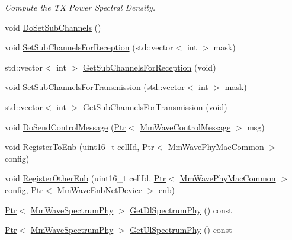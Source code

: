 \begin{DoxyCompactItemize}
\begin{DoxyCompactList}\small\item\em Compute the TX Power Spectral Density. \end{DoxyCompactList}\item 
void \hyperlink{classns3_1_1MmWaveUePhy_a8e0e2f31e720ccd1b156f119b3918bc2}{Do\+Set\+Sub\+Channels} ()
\item 
void \hyperlink{classns3_1_1MmWaveUePhy_a79c935f5714cf1e9338248d7e3237733}{Set\+Sub\+Channels\+For\+Reception} (std\+::vector$<$ int $>$ mask)
\item 
std\+::vector$<$ int $>$ \hyperlink{classns3_1_1MmWaveUePhy_ac4ded53bed0b3af38c56692175f13311}{Get\+Sub\+Channels\+For\+Reception} (void)
\item 
void \hyperlink{classns3_1_1MmWaveUePhy_af282ce87d27141f5c0322caf44044a9f}{Set\+Sub\+Channels\+For\+Transmission} (std\+::vector$<$ int $>$ mask)
\item 
std\+::vector$<$ int $>$ \hyperlink{classns3_1_1MmWaveUePhy_ad04070928a373ffa23fae98685a863d9}{Get\+Sub\+Channels\+For\+Transmission} (void)
\item 
void \hyperlink{classns3_1_1MmWaveUePhy_a467bd23a6941464f7c768a5957af0552}{Do\+Send\+Control\+Message} (\hyperlink{classns3_1_1Ptr}{Ptr}$<$ \hyperlink{classns3_1_1MmWaveControlMessage}{Mm\+Wave\+Control\+Message} $>$ msg)
\item 
void \hyperlink{classns3_1_1MmWaveUePhy_ade37d87b04ca1863e1cc69d62bc2c95f}{Register\+To\+Enb} (uint16\+\_\+t cell\+Id, \hyperlink{classns3_1_1Ptr}{Ptr}$<$ \hyperlink{classns3_1_1MmWavePhyMacCommon}{Mm\+Wave\+Phy\+Mac\+Common} $>$ config)
\item 
void \hyperlink{classns3_1_1MmWaveUePhy_ada365829270ef4a993c4e1247ca5b041}{Register\+Other\+Enb} (uint16\+\_\+t cell\+Id, \hyperlink{classns3_1_1Ptr}{Ptr}$<$ \hyperlink{classns3_1_1MmWavePhyMacCommon}{Mm\+Wave\+Phy\+Mac\+Common} $>$ config, \hyperlink{classns3_1_1Ptr}{Ptr}$<$ \hyperlink{classns3_1_1MmWaveEnbNetDevice}{Mm\+Wave\+Enb\+Net\+Device} $>$ enb)
\item 
\hyperlink{classns3_1_1Ptr}{Ptr}$<$ \hyperlink{classns3_1_1MmWaveSpectrumPhy}{Mm\+Wave\+Spectrum\+Phy} $>$ \hyperlink{classns3_1_1MmWaveUePhy_ae2a7d8583554822543d5b62a02e7c8db}{Get\+Dl\+Spectrum\+Phy} () const 
\item 
\hyperlink{classns3_1_1Ptr}{Ptr}$<$ \hyperlink{classns3_1_1MmWaveSpectrumPhy}{Mm\+Wave\+Spectrum\+Phy} $>$ \hyperlink{classns3_1_1MmWaveUePhy_ae691fc457a4262a8ad2674922592a6f4}{Get\+Ul\+Spectrum\+Phy} () const 
\item 

\end{DoxyCompactItemize}
